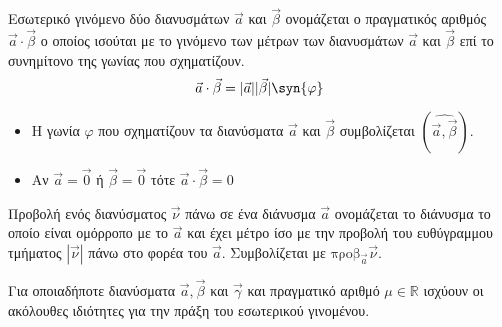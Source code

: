 \documentclass[twoside,nofonts,internet,shmeiwseis]{thewria}
\begin{document}
\orismoi
{}
Εσωτερικό γινόμενο δύο διανυσμάτων $ \vec{a} $ και $ \vec{\beta} $ ονομάζεται ο πραγματικός αριθμός $ \vec{a}\cdot\vec{\beta} $ ο οποίος ισούται με το γινόμενο των μέτρων των διανυσμάτων $ \vec{a} $ και $ \vec{\beta} $ επί το συνημίτονο της γωνίας που σχηματίζουν.
\[ \vec{a}\cdot\vec{\beta}=|\vec{a}||\vec{\beta}|\syn{\varphi} \]
\begin{itemize}
\item Η γωνία $ \varphi $ που σχηματίζουν τα διανύσματα $ \vec{a} $ και $ \vec{\beta} $ συμβολίζεται $ ( \widehat{\vec{a}, \vec{\beta}})  $.
\item Αν $ \vec{a}=\vec{0} $ ή $ \vec{\beta}=\vec{0} $ τότε $ \vec{a}\cdot\vec{\beta}=0 $
\end{itemize}
Προβολή ενός διανύσματος $ \vec{\nu} $ πάνω σε ένα διάνυσμα $ \vec{a} $ ονομάζεται το διάνυσμα το οποίο είναι ομόρροπο με το $ \vec{a} $ και έχει μέτρο ίσο με την προβολή του ευθύγραμμου τμήματος $ |\vec{\nu}| $ πάνω στο φορέα του $ \vec{a} $. Συμβολίζεται με $ \textrm{προβ}_{\vec{a}}{\vec{\nu}} $.
\begin{center}
\end{center}
\thewrhmata
{}
Για οποιαδήποτε διανύσματα $ \vec{a},\vec{\beta} $ και $ \vec{\gamma} $ και πραγματικό αριθμό $ \mu\in\mathbb{R} $ ισχύουν οι ακόλουθες ιδιότητες για την πράξη του εσωτερικού γινομένου.
\end{document}

